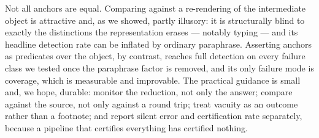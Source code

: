 \documentclass[11pt]{article}
\theoremstyle{definition}
\begin{document}
Not all anchors are equal. Comparing against a re-rendering of the intermediate
object is attractive and, as we showed, partly illusory: it is structurally blind
to exactly the distinctions the representation erases --- notably typing --- and
its headline detection rate can be inflated by ordinary paraphrase. Asserting
anchors as predicates over the object, by contrast, reaches full detection on
every failure class we tested once the paraphrase factor is removed, and its only
failure mode is coverage, which is measurable and improvable. The practical
guidance is small and, we hope, durable: monitor the reduction, not only the
answer; compare against the source, not only against a round trip; treat vacuity
as an outcome rather than a footnote; and report silent error and certification
rate separately, because a pipeline that certifies everything has certified
nothing.


\end{document}
